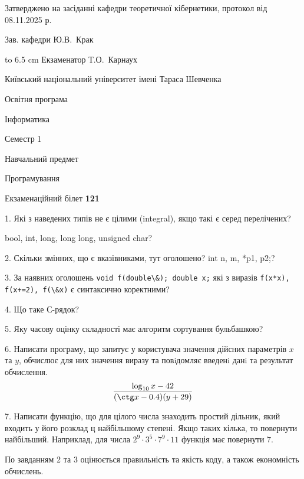 \documentclass[12pt, ukrainian]{article}
\def\code#1{\Verb!#1!}
\begin{document}
{\smallskip\smallskip \begin {scriptsize} Затверджено на засіданні кафедри теоретичної кібернетики, протокол   від   08.11.2025 р.\par\smallskip\smallskip\smallskip\smallskip
{\parbox {6.5 cm} {Зав. кафедри \dotfill Ю.В.~Крак}}\hspace {0.7cm} {\hbox to 6.5 cm { Екзаменатор \dotfill Т.О.~Карнаух}} \end{scriptsize}}
\newpage
{{\begin {scriptsize}\par
{ \center  Київський національний університет імені Тараса Шевченка \par}
{\parbox {5 cm}{Освітня програма \hfill}{\parbox {7 cm}{Інформатика\hfill}}\parbox {6 cm}{\hfill Семестр 1}}\par
{\parbox {5 cm} {Навчальний предмет \hfill}\parbox {7 cm}{Програмування \hfill}\parbox {6cm}{\hfill}\par}\vspace{-15pt} \end{scriptsize}}{\center Екзаменаційний білет \No \textbf { 121 }\par}}
{%
1. Які з наведених типів не є цілими (integral), якщо такі є серед перелічених?

bool, int, long, long long, unsigned char?
\par
\vspace{2mm}
2. Скільки змінних, що є вказівниками, тут оголошено?
int n, m, *p1, p2;?
\par
\vspace{2mm}
3. За наявних оголошень \code{void f(double\&); double x;} які з виразів \code{f(x*x), f(x+=2), f(\&x)} є синтаксично коректними?
\par
\vspace{2mm}
4. Що таке С-рядок?
\par
\vspace{2mm}
5. Яку часову оцінку складності має алгоритм сортування бульбашкою?
\par
\vspace{2mm}
6. Написати програму, що запитує у користувача значення дійсних параметрів $x$ та $y$, обчислює для них значення виразу та повiдомляє введенi данi та результат обчислення.
$$\frac{\log_{10} x - 42}{(\ctg x - 0.4) (y + 29)}$$ 

\par
7. Написати функцію, що для цілого числа знаходить простий дільник, який входить у його розклад ц найбільшому степені. Якщо таких кілька, то повернути найбільший. Наприклад, для числа $2^{9}{\cdot}3^5{\cdot}7^9{\cdot}11$ функція має повернути $7$.

По завданням 2 та 3 оцінюється правильність та якість коду, а також економність обчислень.

}
\end{document}
